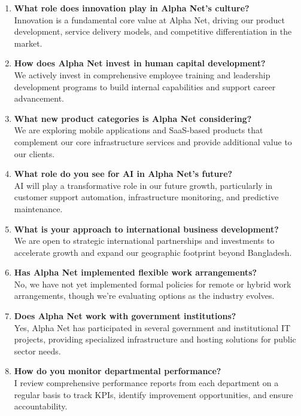 \begin{enumerate}
    \item \textbf{What role does innovation play in Alpha Net's culture?}\\
    Innovation is a fundamental core value at Alpha Net, driving our product development, service delivery models, and competitive differentiation in the market.
    
    \item \textbf{How does Alpha Net invest in human capital development?}\\
    We actively invest in comprehensive employee training and leadership development programs to build internal capabilities and support career advancement.
    
    \item \textbf{What new product categories is Alpha Net considering?}\\
    We are exploring mobile applications and SaaS-based products that complement our core infrastructure services and provide additional value to our clients.
    
    \item \textbf{What role do you see for AI in Alpha Net's future?}\\
    AI will play a transformative role in our future growth, particularly in customer support automation, infrastructure monitoring, and predictive maintenance.
    
    \item \textbf{What is your approach to international business development?}\\
    We are open to strategic international partnerships and investments to accelerate growth and expand our geographic footprint beyond Bangladesh.
    
    \item \textbf{Has Alpha Net implemented flexible work arrangements?}\\
    No, we have not yet implemented formal policies for remote or hybrid work arrangements, though we're evaluating options as the industry evolves.
    
    \item \textbf{Does Alpha Net work with government institutions?}\\
    Yes, Alpha Net has participated in several government and institutional IT projects, providing specialized infrastructure and hosting solutions for public sector needs.
    
    \item \textbf{How do you monitor departmental performance?}\\
    I review comprehensive performance reports from each department on a regular basis to track KPIs, identify improvement opportunities, and ensure accountability.
\end{enumerate}

